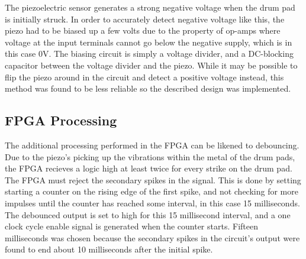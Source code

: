 \documentclass{subfile}
\begin{document}
  The piezoelectric sensor generates a strong negative voltage when the drum pad 
  is initially struck.
  In order to accurately detect negative voltage like this, the piezo had to be biased 
  up a few volts due to the property of op-amps where voltage at the input terminals 
  cannot go below the negative supply, which is in this case 0V.
  The biasing circuit is simply a voltage divider, and a DC-blocking capacitor between the 
  voltage divider and the piezo.
  While it may be possible to flip the piezo around in the circuit and detect a positive 
  voltage instead, this method was found to be less reliable so the described design was 
  implemented.

  \subsection{FPGA Processing} 
  The additional processing performed in the FPGA can be likened to debouncing. 
  Due to the piezo's picking up the vibrations within the metal of the drum pads, 
  the FPGA recieves a logic high at least twice for every strike on the drum pad. 
  The FPGA must reject the secondary spikes in the signal. 
  This is done by setting starting a counter on the rising edge of the first spike, 
  and not checking for more impulses until the counter has reached some 
  interval, in this case 15 milliseconds.
  The debounced output is set to high for this 15 millisecond interval, and a one 
  clock cycle enable signal is generated when the counter starts.
  Fifteen milliseconds was chosen because the secondary spikes in the circuit's 
  output were found to end about 10 milliseconds after the initial spike.
  
\end{document}
